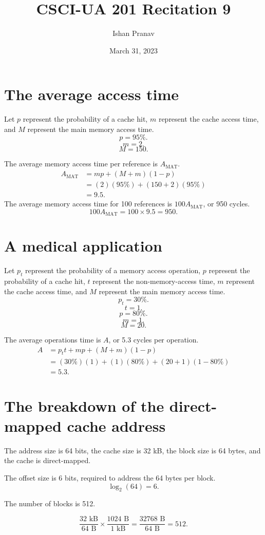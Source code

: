 \documentclass[12pt]{article}
\title{CSCI-UA 201 Recitation 9}
\author{Ishan Pranav}
\date{March 31, 2023}
\begin{document}
\maketitle
\section{The average access time}
Let $p$ represent the probability of a cache hit, $m$ represent the cache access time, and $M$ represent the main memory access time.
\[p=95\%.\]
\[m=2.\]
\[M=150.\]

The average memory access time per reference is $A_{\text{MAT}}$.
\begin{align*}
A_{\text{MAT}}
&=mp+(M+m)(1-p)\\
&=(2)(95\%)+(150+2)(95\%)\\
&=9.5.
\end{align*}
The average memory access time for 100 references is $100A_{\text{MAT}}$, or 950 cycles.
\[100A_{\text{MAT}}=100\times 9.5=950.\]
\section{A medical application}
Let $p_t$ represent the probability of a memory access operation, $p$ represent the probability of a cache hit, $t$ represent the non-memory-access time, $m$ represent the cache access time, and $M$ represent the main memory access time.
\[p_t=30\%.\]
\[t=1.\]
\[p=80\%.\]
\[m=1.\]
\[M=20.\]

The average operations time is $A$, or 5.3 cycles per operation.
\begin{align*}
A
&=p_tt+mp+(M+m)(1-p)\\
&=(30\%)(1)+(1)(80\%)+(20+1)(1-80\%)\\
&=5.3.
\end{align*}
\section{The breakdown of the direct-mapped cache address}
The address size is 64 bits, the cache size is 32 kB, the block size is 64 bytes, and the cache is direct-mapped.

The offset size is 6 bits, required to address the 64 bytes per block.
\[\log_2(64)=6.\]

The number of blocks is 512.

\[\frac{32\text{ kB}}{64\text{ B}}\times\frac{1024\text{ B}}{1\text{ kB}}=\frac{32768\text{ B}}{64\text{ B}}=512.\]
\end{document}
